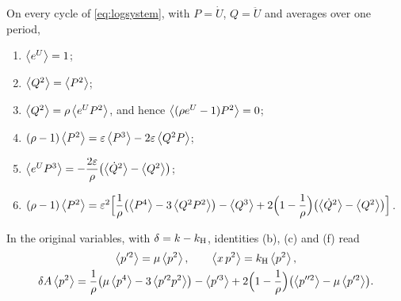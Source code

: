 \begin{lemma}\label{lem:tauidentities}
On every cycle of \eqref{eq:logsystem}, with $P=\dot U$, $Q=\ddot U$ and averages over one period,
\begin{enumerate}[label=\textup{(\alph*)}]
\item $\avg{e^U}=1$;
\item $\avg{Q^2}=\avg{P^2}$;
\item $\avg{Q^2}=\rho\avg{e^UP^2}$, and hence $\avg{(\rho e^U-1)P^2}=0$;
\item $(\rho-1)\avg{P^2}=\varepsilon\avg{P^3}-2\varepsilon\avg{Q^2P}$;
\item $\avg{e^UP^3}=-\dfrac{2\varepsilon}{\rho}\bigl(\avg{\dot Q^2}-\avg{Q^2}\bigr)$;
\item $(\rho-1)\avg{P^2}=\varepsilon^2\Bigl[\dfrac1\rho\bigl(\avg{P^4}-3\avg{Q^2P^2}\bigr)-\avg{Q^3}+2\Bigl(1-\dfrac1\rho\Bigr)\bigl(\avg{\dot Q^2}-\avg{Q^2}\bigr)\Bigr]$.
\end{enumerate}
In the original variables, with $\delta=k-\kH$, identities \textup{(b)}, \textup{(c)} and \textup{(f)} read
\begin{equation}\label{wed:eq:identitiesoriginal}
\begin{gathered}
\avg{p'^2}=\mu\avg{p^2},\qquad \avg{x\,p^2}=\kH\avg{p^2},\\
\delta A\avg{p^2}=\frac1\rho\bigl(\mu\avg{p^4}-3\avg{p'^2p^2}\bigr)-\avg{p'^3}+2\Bigl(1-\frac1\rho\Bigr)\bigl(\avg{p''^2}-\mu\avg{p'^2}\bigr).
\end{gathered}
\end{equation}
\end{lemma}
